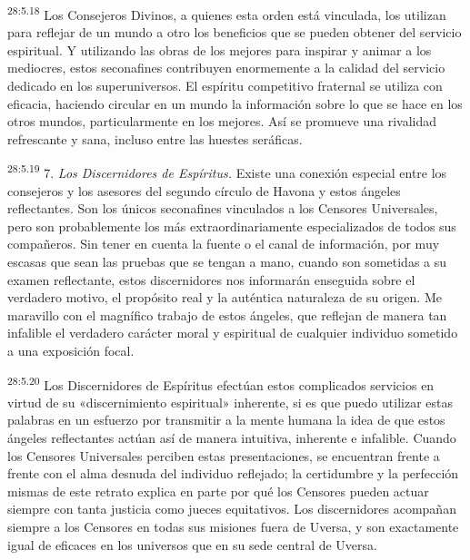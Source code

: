 \par
\textsuperscript{28:5.18} Los Consejeros Divinos, a quienes esta orden está vinculada, los utilizan para reflejar de un mundo a otro los beneficios que se pueden obtener del servicio espiritual. Y utilizando las obras de los mejores para inspirar y animar a los mediocres, estos seconafines contribuyen enormemente a la calidad del servicio dedicado en los superuniversos. El espíritu competitivo fraternal se utiliza con eficacia, haciendo circular en un mundo la información sobre lo que se hace en los otros mundos, particularmente en los mejores. Así se promueve una rivalidad refrescante y sana, incluso entre las huestes seráficas.

\par
\textsuperscript{28:5.19} 7. \textit{Los Discernidores de Espíritus.} Existe una conexión especial entre los consejeros y los asesores del segundo círculo de Havona y estos ángeles reflectantes. Son los únicos seconafines vinculados a los Censores Universales, pero son probablemente los más extraordinariamente especializados de todos sus compañeros. Sin tener en cuenta la fuente o el canal de información, por muy escasas que sean las pruebas que se tengan a mano, cuando son sometidas a su examen reflectante, estos discernidores nos informarán enseguida sobre el verdadero motivo, el propósito real y la auténtica naturaleza de su origen. Me maravillo con el magnífico trabajo de estos ángeles, que reflejan de manera tan infalible el verdadero carácter moral y espiritual de cualquier individuo sometido a una exposición focal.

\par
\textsuperscript{28:5.20} Los Discernidores de Espíritus efectúan estos complicados servicios en virtud de su «discernimiento espiritual» inherente, si es que puedo utilizar estas palabras en un esfuerzo por transmitir a la mente humana la idea de que estos ángeles reflectantes actúan así de manera intuitiva, inherente e infalible. Cuando los Censores Universales perciben estas presentaciones, se encuentran frente a frente con el alma desnuda del individuo reflejado; la certidumbre y la perfección mismas de este retrato explica en parte por qué los Censores pueden actuar siempre con tanta justicia como jueces equitativos. Los discernidores acompañan siempre a los Censores en todas sus misiones fuera de Uversa, y son exactamente igual de eficaces en los universos que en su sede central de Uversa.

